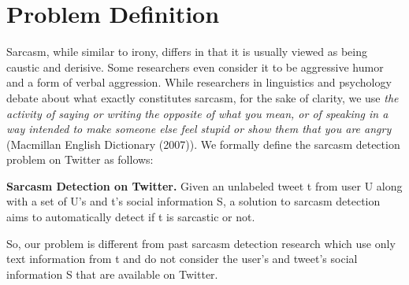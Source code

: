 \section{Problem Definition}
\label{sec:problem}
Sarcasm, while similar to irony, differs in that it is usually viewed as being caustic and derisive. Some researchers even
consider it to be aggressive humor and a form of verbal aggression. While researchers in linguistics and psychology debate about what exactly constitutes sarcasm, for the
sake of clarity, we use \textit{the activity of saying or writing the opposite of what you mean, or of speaking in a way intended to make someone
else feel stupid or show them that you are angry} (Macmillan English Dictionary (2007)). We formally define the sarcasm detection problem on Twitter as follows:
\begin{mydef}
\textbf{Sarcasm Detection on Twitter.} Given an
unlabeled tweet t from user U along with a set of U’s and t's social information S, a solution to sarcasm detection aims to automatically detect if t is sarcastic or not.
\end{mydef}
So, our problem is different from past sarcasm detection research
which use only text information from t and do not consider
the user’s and tweet's social information S that are available on Twitter.